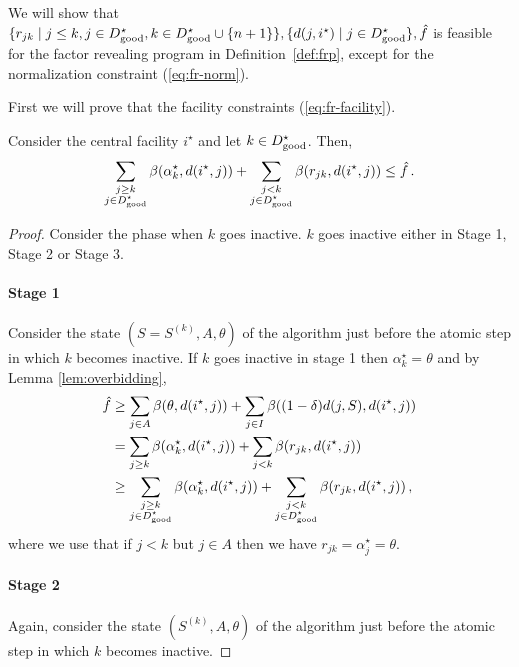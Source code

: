 We will show that $\{r_{jk} \mid j \leq k, j \in D^\star_{\mathrm{good}}, k \in D^\star_{\mathrm{good}} \cup \{n + 1\}\}, \{d(j, i^\star) \mid j \in D^\star_{\mathrm{good}}\}, \hat f$ is feasible for the factor revealing program in Definition~\ref{def:frp}, except for the normalization constraint (\ref{eq:fr-norm}).

First we will prove that the facility constraints (\ref{eq:fr-facility}).
\begin{lemma}
\label{lem:fr-facility}
    Consider the central facility $i^\star$ and let $k \in D^\star_{\mathrm{good}}$. Then,
    \[
        \sum_{\substack{j \ge k\\ j \in D^\star_{\mathrm{good}}}} \beta(\alpha^\star_k, d(i^\star,j)) + \sum_{\substack{j < k\\ j \in D^\star_{\mathrm{good}}}} \beta(r_{jk}, d(i^\star,j)) \le \hat f\,.
    \]
\end{lemma}
\begin{proof}
    Consider the phase when $k$ goes inactive. 
    $k$ goes inactive either in Stage 1, Stage 2 or Stage 3.
    \paragraph{Stage 1}
    Consider the state $(S=S^{(k)},A,\theta)$ of the algorithm just before the atomic step in which $k$ becomes inactive.
    If $k$ goes inactive in stage 1 then $\alpha^\star_k = \theta$ and by Lemma \ref{lem:overbidding},
    \begin{align*}
        \hat f & \ge \sum_{j \in A} \beta(\theta, d(i^\star,j)) + \sum_{j \in I} \beta((1-\delta)d(j, S), d(i^\star,j)) 
        \\ & = \sum_{j \ge k} \beta(\alpha^\star_k, d(i^\star,j)) + \sum_{j < k} \beta(r_{jk}, d(i^\star,j)) 
        \\ & \ge \sum_{\substack{j \ge k\\ j \in D^\star_{\mathrm{good}}}} \beta(\alpha^\star_k, d(i^\star,j)) + \sum_{\substack{j < k\\ j \in D^\star_{\mathrm{good}}}} \beta(r_{jk}, d(i^\star,j))\,,
    \end{align*}
    where we use that if $j < k$ but $j \in A$ then we have $r_{jk} = \alpha_j^\star = \theta$.
    \paragraph{Stage 2}
    Again, consider the state $(S^{(k)},A,\theta)$ of the algorithm just before the atomic step in which $k$ becomes inactive.


\end{proof}
